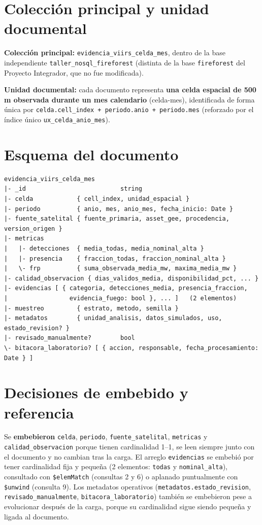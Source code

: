 \documentclass[11pt]{article}
\begin{document}
\section{Colección principal y unidad documental}

\textbf{Colección principal:} \texttt{evidencia\_viirs\_celda\_mes}, dentro
de la base independiente \texttt{taller\_nosql\_fireforest} (distinta de la
base \texttt{fireforest} del Proyecto Integrador, que no fue modificada).

\textbf{Unidad documental:} cada documento representa \textbf{una celda
espacial de 500\,m observada durante un mes calendario} (celda-mes),
identificada de forma única por \lstinline!celda.cell_index + periodo.anio + periodo.mes!
(reforzado por el índice único \texttt{ux\_celda\_anio\_mes}).

\section{Esquema del documento}

\begin{lstlisting}[language={}, basicstyle=\ttfamily\footnotesize]
evidencia_viirs_celda_mes
|- _id                          string
|- celda            { cell_index, unidad_espacial }
|- periodo          { anio, mes, anio_mes, fecha_inicio: Date }
|- fuente_satelital { fuente_primaria, asset_gee, procedencia, version_origen }
|- metricas
|   |- detecciones  { media_todas, media_nominal_alta }
|   |- presencia    { fraccion_todas, fraccion_nominal_alta }
|   \- frp          { suma_observada_media_mw, maxima_media_mw }
|- calidad_observacion { dias_validos_media, disponibilidad_pct, ... }
|- evidencias [ { categoria, detecciones_media, presencia_fraccion,
|                 evidencia_fuego: bool }, ... ]   (2 elementos)
|- muestreo         { estrato, metodo, semilla }
|- metadatos        { unidad_analisis, datos_simulados, uso, estado_revision? }
|- revisado_manualmente?        bool
\- bitacora_laboratorio? [ { accion, responsable, fecha_procesamiento: Date } ]
\end{lstlisting}

\section{Decisiones de embebido y referencia}

Se \textbf{embebieron} \lstinline!celda!, \lstinline!periodo!,
\lstinline!fuente_satelital!, \lstinline!metricas! y
\lstinline!calidad_observacion! porque tienen cardinalidad 1--1, se leen
siempre junto con el documento y no cambian tras la carga. El arreglo
\lstinline!evidencias! se embebió por tener cardinalidad fija y pequeña (2
elementos: \texttt{todas} y \texttt{nominal\_alta}), consultado con
\lstinline!$elemMatch! (consultas 2 y 6) o aplanado puntualmente con
\lstinline!$unwind! (consulta 9). Los metadatos operativos
(\lstinline!metadatos.estado_revision!, \lstinline!revisado_manualmente!,
\lstinline!bitacora_laboratorio!) también se embebieron pese a evolucionar
después de la carga, porque su cardinalidad sigue siendo pequeña y ligada al
documento.
\end{document}
